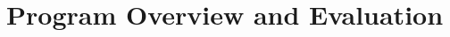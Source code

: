 %
%
\let\textcircled=\pgftextcircled
\chapter{Program Overview and Evaluation}
\label{chap:Overview and Evaluation}







